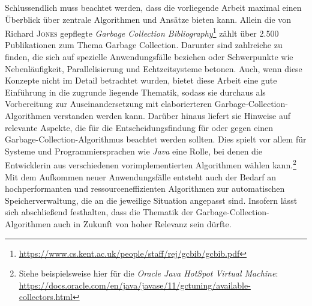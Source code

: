 Schlussendlich muss beachtet werden, dass die vorliegende Arbeit maximal einen Überblick über zentrale Algorithmen und Ansätze bieten kann.
Allein die von Richard \textsc{Jones} gepflegte \textit{Garbage Collection Bibliography}\footnote{\url{https://www.cs.kent.ac.uk/people/staff/rej/gcbib/gcbib.pdf}} zählt über 2.500 Publikationen zum Thema Garbage Collection.
Darunter sind zahlreiche zu finden, die sich auf spezielle Anwendungsfälle beziehen oder Schwerpunkte wie Nebenläufigkeit, Parallelisierung und Echtzeitsysteme betonen.
Auch, wenn diese Konzepte nicht im Detail betrachtet wurden, bietet diese Arbeit eine gute Einführung in die zugrunde liegende Thematik, sodass sie durchaus als Vorbereitung zur Auseinandersetzung mit elaborierteren Garbage-Collection-Algorithmen verstanden werden kann.
Darüber hinaus liefert sie Hinweise auf relevante Aspekte, die für die Entscheidungsfindung für oder gegen einen Garbage-Collection-Algorithmus beachtet werden sollten.
Dies spielt vor allem für Systeme und Programmiersprachen wie \textit{Java} eine Rolle, bei denen die Entwicklerin aus verschiedenen vorimplementierten Algorithmen wählen kann.\footnote{Siehe beispielsweise hier für die \textit{Oracle Java HotSpot Virtual Machine}: \url{https://docs.oracle.com/en/java/javase/11/gctuning/available-collectors.html}}
Mit dem Aufkommen neuer Anwendungsfälle entsteht auch der Bedarf an hochperformanten und ressourceneffizienten Algorithmen zur automatischen Speicherverwaltung, die an die jeweilige Situation angepasst sind.
Insofern lässt sich abschließend festhalten, dass die Thematik der Garbage-Collection-Algorithmen auch in Zukunft von hoher Relevanz sein dürfte.
